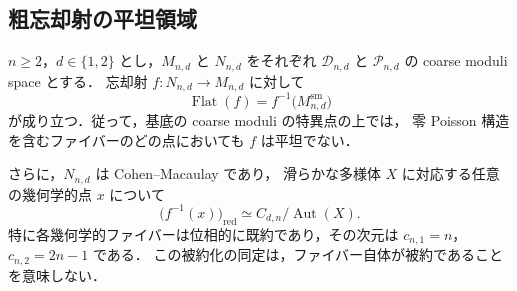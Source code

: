 \subsection{粗忘却射の平坦領域}

\begin{theorem}[粗忘却射の平坦領域]
\label{thm:coarse-flat-locus}
$n\geq2$，$d\in\{1,2\}$ とし，$M_{n,d}$ と $N_{n,d}$ をそれぞれ
$\mathcal D_{n,d}$ と $\mathcal P_{n,d}$ の coarse moduli space とする．
忘却射 $f:N_{n,d}\to M_{n,d}$ に対して
\[
 \operatorname{Flat}(f)=f^{-1}\bigl(M_{n,d}^{\mathrm{sm}}\bigr)
\]
が成り立つ．従って，基底の coarse moduli の特異点の上では，
零 Poisson 構造を含むファイバーのどの点においても $f$ は平坦でない．

さらに，$N_{n,d}$ は Cohen--Macaulay であり，
滑らかな多様体 $X$ に対応する任意の幾何学的点 $x$ について
\[
 \bigl(f^{-1}(x)\bigr)_{\mathrm{red}}
 \simeq C_{d,n}/\operatorname{Aut}(X).
\]
特に各幾何学的ファイバーは位相的に既約であり，その次元は
$c_{n,1}=n$，$c_{n,2}=2n-1$ である．
この被約化の同定は，ファイバー自体が被約であることを意味しない．
\end{theorem}

